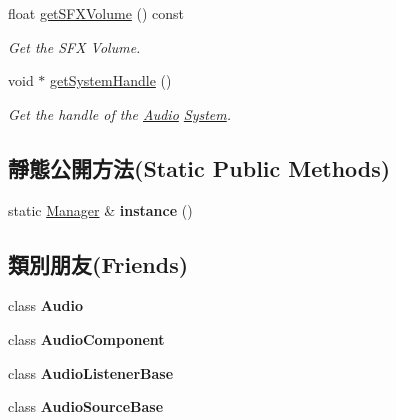 \begin{DoxyCompactItemize}
float \hyperlink{class_i_dream_sky_1_1_audio_1_1_manager_a97df6d7c2738ba77d35581978a076379}{get\+S\+F\+X\+Volume} () const 
\begin{DoxyCompactList}\small\item\em Get the S\+FX Volume. \end{DoxyCompactList}\item 
void $\ast$ \hyperlink{class_i_dream_sky_1_1_audio_1_1_manager_a666d38790d8532041580f8908be4c3ed}{get\+System\+Handle} ()
\begin{DoxyCompactList}\small\item\em Get the handle of the \hyperlink{class_i_dream_sky_1_1_audio}{Audio} \hyperlink{class_i_dream_sky_1_1_system}{System}. \end{DoxyCompactList}\end{DoxyCompactItemize}
\subsection*{靜態公開方法(Static Public Methods)}
\begin{DoxyCompactItemize}
\item 
static \hyperlink{class_i_dream_sky_1_1_audio_1_1_manager}{Manager} \& {\bfseries instance} ()\hypertarget{class_i_dream_sky_1_1_audio_1_1_manager_a9f266534db2ea5671e2a008b228bf3c3}{}\label{class_i_dream_sky_1_1_audio_1_1_manager_a9f266534db2ea5671e2a008b228bf3c3}

\end{DoxyCompactItemize}
\subsection*{類別朋友(Friends)}
\begin{DoxyCompactItemize}
\item 
class {\bfseries Audio}\hypertarget{class_i_dream_sky_1_1_audio_1_1_manager_a211f008bd6a46efe478fe81d31e28933}{}\label{class_i_dream_sky_1_1_audio_1_1_manager_a211f008bd6a46efe478fe81d31e28933}

\item 
class {\bfseries Audio\+Component}\hypertarget{class_i_dream_sky_1_1_audio_1_1_manager_af76924648e1e664d148d0e3951b5a9ce}{}\label{class_i_dream_sky_1_1_audio_1_1_manager_af76924648e1e664d148d0e3951b5a9ce}

\item 
class {\bfseries Audio\+Listener\+Base}\hypertarget{class_i_dream_sky_1_1_audio_1_1_manager_a76a29692301e521e926995991a14b87d}{}\label{class_i_dream_sky_1_1_audio_1_1_manager_a76a29692301e521e926995991a14b87d}

\item 
class {\bfseries Audio\+Source\+Base}\hypertarget{class_i_dream_sky_1_1_audio_1_1_manager_a93f447a7ad19640b0dd05bafe9ba5552}{}\label{class_i_dream_sky_1_1_audio_1_1_manager_a93f447a7ad19640b0dd05bafe9ba5552}

\end{DoxyCompactItemize}


